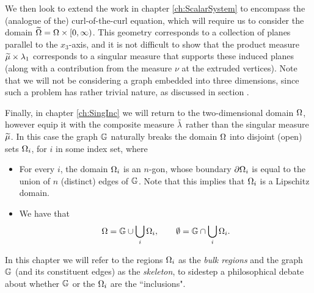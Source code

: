 We then look to extend the work in chapter \ref{ch:ScalarSystem} to encompass the (analogue of the) curl-of-the-curl equation, which will require us to consider the domain $\widetilde{\Omega} = \Omega\times[0,\infty)$.
This geometry corresponds to a collection of planes parallel to the $x_3$-axis, and it is not difficult to show that the product measure $\widetilde{\mu}\times\lambda_1$ corresponds to a singular measure that supports these induced planes (along with a contribution from the measure $\nu$ at the extruded vertices).
Note that we will not be considering a graph embedded into three dimensions, since such a problem has rather trivial nature, as discussed in section .

Finally, in chapter \ref{ch:SingInc} we will return to the two-dimensional domain $\Omega$, however equip it with the composite measure $\tilde{\lambda}$ rather than the singular measure $\widetilde{\mu}$.
In this case the graph $\mathbb{G}$ naturally breaks the domain $\Omega$ into disjoint (open) sets $\Omega_i$, for $i$ in some index set, where
\begin{itemize}
	\item For every $i$, the domain $\Omega_i$ is an $n$-gon, whose boundary $\partial\Omega_i$ is equal to the union of $n$ (distinct) edges of $\mathbb{G}$.
	Note that this implies that $\Omega_i$ is a Lipschitz domain.
	\item We have that
	\begin{align*}
		\Omega = \mathbb{G} \cup \bigcup_{i}\Omega_i,
		\qquad
		\emptyset = \mathbb{G} \cap \bigcup_{i}\Omega_i.
	\end{align*}
\end{itemize}
In this chapter we will refer to the regions $\Omega_i$ as the \emph{bulk regions} and the graph $\mathbb{G}$ (and its constituent edges) as the \emph{skeleton}, to sidestep a philosophical debate about whether $\mathbb{G}$ or the $\Omega_i$ are the ``inclusions".